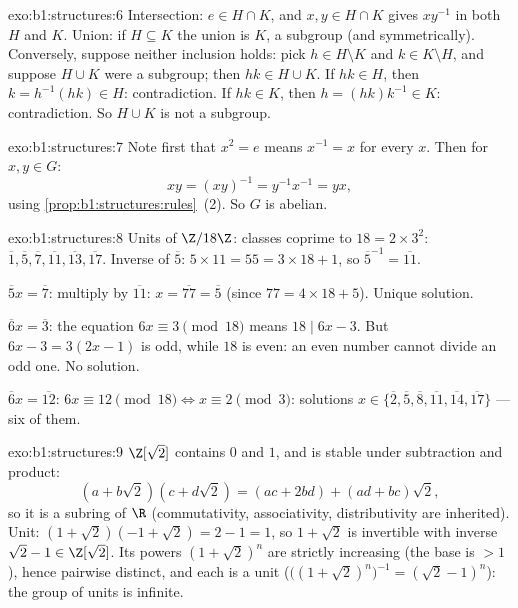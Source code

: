 \begin{solution}{exo:b1:structures:6}
Intersection: $e \in H \cap K$, and $x, y \in H \cap K$ gives
$xy^{-1}$ in both $H$ and $K$. Union: if $H \subseteq K$ the union is
$K$, a subgroup (and symmetrically). Conversely, suppose neither
inclusion holds: pick $h \in H \setminus K$ and $k \in K \setminus
H$, and suppose $H \cup K$ were a subgroup; then $hk \in H \cup K$.
If $hk \in H$, then $k = h^{-1}(hk) \in H$: contradiction. If $hk \in
K$, then $h = (hk)k^{-1} \in K$: contradiction. So $H \cup K$ is not
a subgroup.
\end{solution}

\begin{solution}{exo:b1:structures:7}
Note first that $x^2 = e$ means $x^{-1} = x$ for every $x$. Then for
$x, y \in G$:
\[
xy = (xy)^{-1} = y^{-1} x^{-1} = yx ,
\]
using \cref{prop:b1:structures:rules}~(2). So $G$ is abelian.
\end{solution}

\begin{solution}{exo:b1:structures:8}
Units of $\Z/18\Z$: classes coprime to $18 = 2 \times 3^2$:
$\overline 1, \overline 5, \overline 7, \overline{11}, \overline{13},
\overline{17}$. Inverse of $\overline 5$: $5 \times 11 = 55 = 3\times
18 + 1$, so $\overline 5^{-1} = \overline{11}$.

$\overline 5 x = \overline 7$: multiply by $\overline{11}$: $x =
\overline{77} = \overline 5$ (since $77 = 4\times 18 + 5$). Unique
solution.

$\overline 6 x = \overline 3$: the equation $6x \equiv 3 \pmod{18}$
means $18 \mid 6x - 3$. But $6x - 3 = 3(2x - 1)$ is odd, while $18$
is even: an even number cannot divide an odd one. No solution.

$\overline 6 x = \overline{12}$: $6x \equiv 12 \pmod{18} \iff x
\equiv 2 \pmod 3$: solutions $x \in \{\overline 2, \overline 5,
\overline 8, \overline{11}, \overline{14}, \overline{17}\}$ --- six
of them.
\end{solution}

\begin{solution}{exo:b1:structures:9}
$\Z[\sqrt 2]$ contains $0$ and $1$, and is stable under subtraction
and product:
\[
(a + b\sqrt 2)(c + d\sqrt 2) = (ac + 2bd) + (ad + bc)\sqrt 2 ,
\]
so it is a subring of $\R$ (commutativity, associativity,
distributivity are inherited). Unit: $(1 + \sqrt 2)(-1 + \sqrt 2) =
2 - 1 = 1$, so $1 + \sqrt 2$ is invertible with inverse $\sqrt 2 - 1
\in \Z[\sqrt 2]$. Its powers $(1 + \sqrt 2)^n$ are strictly
increasing (the base is $> 1$), hence pairwise distinct, and each is
a unit ($\bigl((1+\sqrt2)^n\bigr)^{-1} = (\sqrt 2 - 1)^n$): the group
of units is infinite.
\end{solution}

